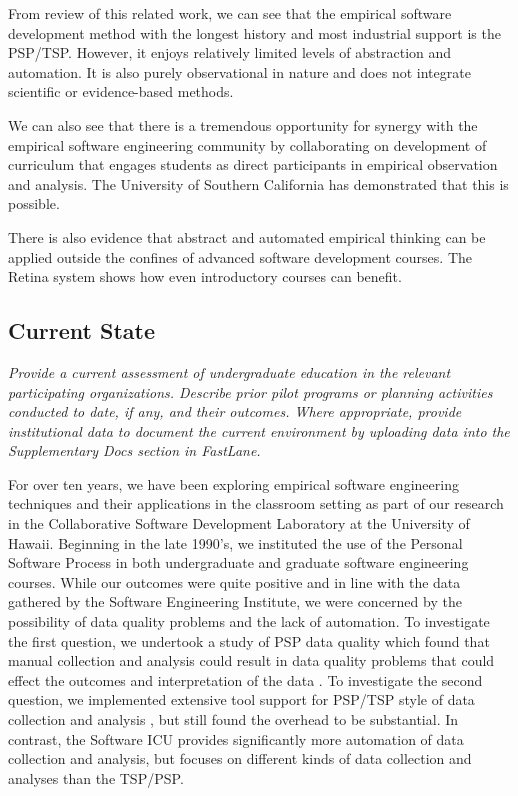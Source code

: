 From review of this related work, we can see that the empirical software
development method with the longest history and most industrial support is
the PSP/TSP.  However, it enjoys relatively limited levels of abstraction
and automation.  It is also purely observational in nature and does not
integrate scientific or evidence-based methods.

We can also see that there is a tremendous opportunity for synergy with the
empirical software engineering community by collaborating on development of
curriculum that engages students as direct participants in empirical
observation and analysis.  The University of Southern California has
demonstrated that this is possible.

There is also evidence that abstract and automated empirical thinking can
be applied outside the confines of advanced software development courses.
The Retina system shows how even introductory courses can benefit.


\subsection{Current State}

{\em Provide a current assessment of undergraduate education in the
relevant participating organizations.  Describe prior pilot programs or
planning activities conducted to date, if any, and their outcomes.  Where
appropriate, provide institutional data to document the current environment
by uploading data into the Supplementary Docs section in FastLane.}

\bigskip

For over ten years, we have been exploring empirical software engineering
techniques and their applications in the classroom setting as part of our
research in the Collaborative Software Development Laboratory at the
University of Hawaii.  Beginning in the late 1990's, we instituted the use
of the Personal Software Process in both undergraduate and graduate
software engineering courses.  While our outcomes were quite positive and
in line with the data gathered by the Software Engineering Institute, we
were concerned by the possibility of data quality problems and the lack of
automation.  To investigate the first question, we undertook a study of PSP
data quality which found that manual collection and analysis could result
in data quality problems that could effect the outcomes and interpretation
of the data \citep{csdl-98-13,csdl-98-11}.  To investigate the second question, we
implemented extensive tool support for PSP/TSP style of data collection and
analysis \citep{csdl2-00-03}, but still found the overhead to be
substantial\citep{csdl2-01-12}. In contrast, the Software ICU provides
significantly more automation of data collection and analysis, but focuses
on different kinds of data collection and analyses than the TSP/PSP.

